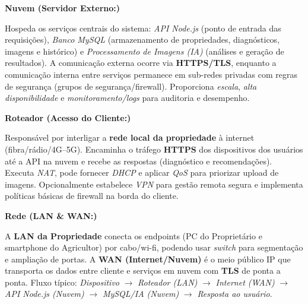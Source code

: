 \noindent\textbf{Nuvem (Servidor Externo:)}\par
Hospeda os serviços centrais do sistema: \textit{API Node.js} (ponto de entrada das requisições), 
\textit{Banco MySQL} (armazenamento de propriedades, diagnósticos, imagens e histórico) e 
\textit{Processamento de Imagens (IA)} (análises e geração de resultados). A comunicação externa 
ocorre via \textbf{HTTPS/TLS}, enquanto a comunicação interna entre serviços permanece em sub-redes 
privadas com regras de segurança (grupos de segurança/firewall). Proporciona \textit{escala}, 
\textit{alta disponibilidade} e \textit{monitoramento/logs} para auditoria e desempenho.

\medskip
\noindent\textbf{Roteador (Acesso do Cliente:)}\par
Responsável por interligar a \textbf{rede local da propriedade} à internet (fibra/rádio/4G--5G). 
Encaminha o tráfego \textbf{HTTPS} dos dispositivos dos usuários até a API na nuvem e recebe as respostas
(diagnóstico e recomendações). Executa \textit{NAT}, pode fornecer \textit{DHCP} e aplicar \textit{QoS} 
para priorizar upload de imagens. Opcionalmente estabelece \textit{VPN} para gestão remota segura e 
implementa políticas básicas de firewall na borda do cliente.

\medskip
\noindent\textbf{Rede (LAN \& WAN:)}\par
A \textbf{LAN da Propriedade} conecta os endpoints (PC do Proprietário e smartphone do Agricultor) 
por cabo/wi-fi, podendo usar \textit{switch} para segmentação e ampliação de portas. A 
\textbf{WAN (Internet/Nuvem)} é o meio público IP que transporta os dados entre cliente e serviços 
em nuvem com \textbf{TLS} de ponta a ponta. Fluxo típico: \textit{Dispositivo} $\rightarrow$ 
\textit{Roteador (LAN)} $\rightarrow$ \textit{Internet (WAN)} $\rightarrow$ 
\textit{API Node.js (Nuvem)} $\rightarrow$ \textit{MySQL/IA (Nuvem)} $\rightarrow$ 
\textit{Resposta ao usuário}.
\medskip